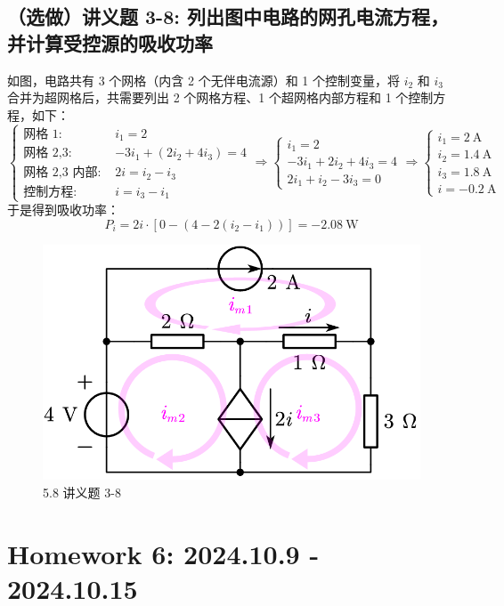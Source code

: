 \documentclass[UTF8]{report}
\theoremstyle{MyLineTheoremStyle} %
\theoremstyle{MyBlockTheoremStyle} %
\theoremstyle{MySubsubsectionStyle} %
\begin{document}
\section{（选做）讲义题 3-8: 列出图中电路的网孔电流方程，并计算受控源的吸收功率}

如图，电路共有 3 个网格（内含 2 个无伴电流源）和 1 个控制变量，将 $i_2$ 和 $i_3$ 合并为超网格后，共需要列出 2 个网格方程、1 个超网格内部方程和 1 个控制方程，如下：
\begin{equation}
\begin{cases}
    \text{网格 1: } & i_1 = 2\\ 
    \text{网格 2,3: } & -3i_1 + (2i_2 + 4i_3) = 4\\ 
    \text{网格 2,3 内部: } & 2i = i_2 - i_3\\ 
    \text{控制方程: } & i = i_3 - i_1
\end{cases}\Longrightarrow 
\begin{cases}
    i_1 = 2 \\ 
    -3i_1 + 2i_2 + 4i_3 = 4 \\
    2i_1 + i_2 - 3i_3 = 0
\end{cases}
\Longrightarrow 
\begin{cases}
    i_1 = 2 \ \mathrm{A}\\ 
    i_2 = 1.4 \ \mathrm{A}\\ 
    i_3 = 1.8 \ \mathrm{A} \\ 
    i = -0.2 \ \mathrm{A}
\end{cases}
\end{equation}
于是得到吸收功率：
\begin{equation}
    P_{i} = 2i \cdot \left[ 0 - \left(4 - 2(i_2 - i_1)\right) \right] = -2.08 \ \mathrm{W}
\end{equation}

\begin{figure}[H]\centering
\includegraphics[width=0.5\columnwidth]{assets/5/5.8.png}
\caption{ 5.8 讲义题 3-8}\label{5.8 讲义题 3-8}
\end{figure}


\chapter{Homework 6: 2024.10.9 - 2024.10.15}
\thispagestyle{fancy}
\end{document}
